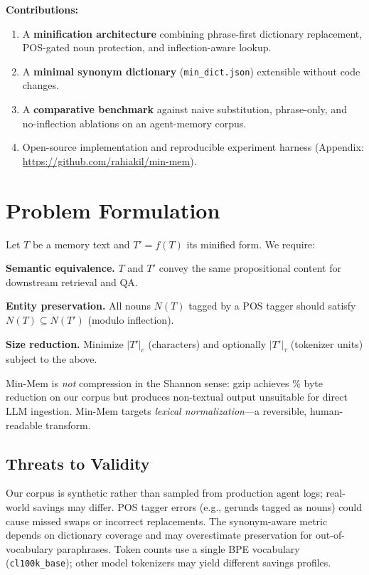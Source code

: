 \documentclass[10pt,twocolumn]{article}
\begin{document}
\textbf{Contributions:}
\begin{enumerate}
    \item A \textbf{minification architecture} combining phrase-first dictionary replacement, POS-gated noun protection, and inflection-aware lookup.
    \item A \textbf{minimal synonym dictionary} (\texttt{min\_dict.json}) extensible without code changes.
    \item A \textbf{comparative benchmark} against naive substitution, phrase-only, and no-inflection ablations on an agent-memory corpus.
    \item Open-source implementation and reproducible experiment harness (Appendix: \url{https://github.com/rahiakil/min-mem}).
\end{enumerate}

\section{Problem Formulation}

Let $T$ be a memory text and $T' = f(T)$ its minified form. We require:

\textbf{Semantic equivalence.} $T$ and $T'$ convey the same propositional content for downstream retrieval and QA.

\textbf{Entity preservation.} All nouns $N(T)$ tagged by a POS tagger should satisfy $N(T) \subseteq N(T')$ (modulo inflection).

\textbf{Size reduction.} Minimize $|T'|_c$ (characters) and optionally $|T'|_\tau$ (tokenizer units) subject to the above.

Min-Mem is \emph{not} compression in the Shannon sense: gzip achieves \GzipSavings\% byte reduction on our corpus but produces non-textual output unsuitable for direct LLM ingestion. Min-Mem targets \emph{lexical normalization}---a reversible, human-readable transform.

\subsection{Threats to Validity}

Our corpus is synthetic rather than sampled from production agent logs; real-world savings may differ. POS tagger errors (e.g., gerunds tagged as nouns) could cause missed swaps or incorrect replacements. The synonym-aware metric depends on dictionary coverage and may overestimate preservation for out-of-vocabulary paraphrases. Token counts use a single BPE vocabulary (\texttt{cl100k\_base}); other model tokenizers may yield different savings profiles.
\end{document}
